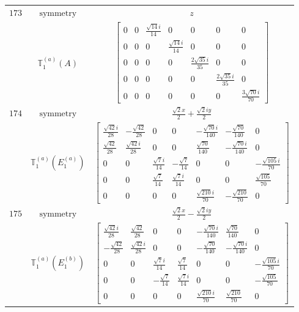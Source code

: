 \documentclass[fleqn,8pt,landscape]{jsarticle}
\begin{document}
\begin{longtable}{ccc}
$ 173 $ & $ \text{symmetry} $ & $ z $ \\
$  $ & $ \mathbb{T}_{1}^{(a)}(A) $ & $ \begin{bmatrix} 0 & 0 & \frac{\sqrt{14} i}{14} & 0 & 0 & 0 & 0 \\ 0 & 0 & 0 & \frac{\sqrt{14} i}{14} & 0 & 0 & 0 \\ 0 & 0 & 0 & 0 & \frac{2 \sqrt{35} i}{35} & 0 & 0 \\ 0 & 0 & 0 & 0 & 0 & \frac{2 \sqrt{35} i}{35} & 0 \\ 0 & 0 & 0 & 0 & 0 & 0 & \frac{3 \sqrt{70} i}{70} \end{bmatrix} $ \\ \hline
$ 174 $ & $ \text{symmetry} $ & $ \frac{\sqrt{2} x}{2} + \frac{\sqrt{2} i y}{2} $ \\
$  $ & $ \mathbb{T}_{1}^{(a)}(E_{1}^{(a)}) $ & $ \begin{bmatrix} \frac{\sqrt{42} i}{28} & - \frac{\sqrt{42}}{28} & 0 & 0 & - \frac{\sqrt{70} i}{140} & - \frac{\sqrt{70}}{140} & 0 \\ \frac{\sqrt{42}}{28} & \frac{\sqrt{42} i}{28} & 0 & 0 & \frac{\sqrt{70}}{140} & - \frac{\sqrt{70} i}{140} & 0 \\ 0 & 0 & \frac{\sqrt{7} i}{14} & - \frac{\sqrt{7}}{14} & 0 & 0 & - \frac{\sqrt{105} i}{70} \\ 0 & 0 & \frac{\sqrt{7}}{14} & \frac{\sqrt{7} i}{14} & 0 & 0 & \frac{\sqrt{105}}{70} \\ 0 & 0 & 0 & 0 & \frac{\sqrt{210} i}{70} & - \frac{\sqrt{210}}{70} & 0 \end{bmatrix} $ \\ \hline
$ 175 $ & $ \text{symmetry} $ & $ \frac{\sqrt{2} x}{2} - \frac{\sqrt{2} i y}{2} $ \\
$  $ & $ \mathbb{T}_{1}^{(a)}(E_{1}^{(b)}) $ & $ \begin{bmatrix} \frac{\sqrt{42} i}{28} & \frac{\sqrt{42}}{28} & 0 & 0 & - \frac{\sqrt{70} i}{140} & \frac{\sqrt{70}}{140} & 0 \\ - \frac{\sqrt{42}}{28} & \frac{\sqrt{42} i}{28} & 0 & 0 & - \frac{\sqrt{70}}{140} & - \frac{\sqrt{70} i}{140} & 0 \\ 0 & 0 & \frac{\sqrt{7} i}{14} & \frac{\sqrt{7}}{14} & 0 & 0 & - \frac{\sqrt{105} i}{70} \\ 0 & 0 & - \frac{\sqrt{7}}{14} & \frac{\sqrt{7} i}{14} & 0 & 0 & - \frac{\sqrt{105}}{70} \\ 0 & 0 & 0 & 0 & \frac{\sqrt{210} i}{70} & \frac{\sqrt{210}}{70} & 0 \end{bmatrix} $ \\ \hline

\end{longtable}
\end{document}

